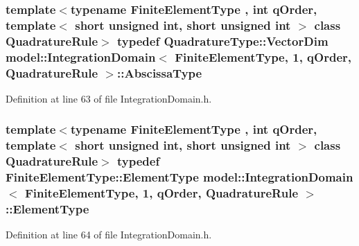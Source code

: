 \subsubsection[{Abscissa\+Type}]{\setlength{\rightskip}{0pt plus 5cm}template$<$typename Finite\+Element\+Type , int q\+Order, template$<$ short unsigned int, short unsigned int $>$ class Quadrature\+Rule$>$ typedef {\bf Quadrature\+Type\+::\+Vector\+Dim} {\bf model\+::\+Integration\+Domain}$<$ Finite\+Element\+Type, 1, q\+Order, Quadrature\+Rule $>$\+::{\bf Abscissa\+Type}}\label{structmodel_1_1_integration_domain_3_01_finite_element_type_00_011_00_01q_order_00_01_quadrature_rule_01_4_a7e1987441ecbe7f224f67657f97d115e}


Definition at line 63 of file Integration\+Domain.\+h.

\hypertarget{structmodel_1_1_integration_domain_3_01_finite_element_type_00_011_00_01q_order_00_01_quadrature_rule_01_4_a0c38472ef1c1f37f1c32e49a5cdc2f71}{}
\subsubsection[{Element\+Type}]{\setlength{\rightskip}{0pt plus 5cm}template$<$typename Finite\+Element\+Type , int q\+Order, template$<$ short unsigned int, short unsigned int $>$ class Quadrature\+Rule$>$ typedef Finite\+Element\+Type\+::\+Element\+Type {\bf model\+::\+Integration\+Domain}$<$ Finite\+Element\+Type, 1, q\+Order, Quadrature\+Rule $>$\+::{\bf Element\+Type}}\label{structmodel_1_1_integration_domain_3_01_finite_element_type_00_011_00_01q_order_00_01_quadrature_rule_01_4_a0c38472ef1c1f37f1c32e49a5cdc2f71}


Definition at line 64 of file Integration\+Domain.\+h.

\hypertarget{structmodel_1_1_integration_domain_3_01_finite_element_type_00_011_00_01q_order_00_01_quadrature_rule_01_4_a7873d1cffeaa8a8dde260fefa1827dbd}{}
